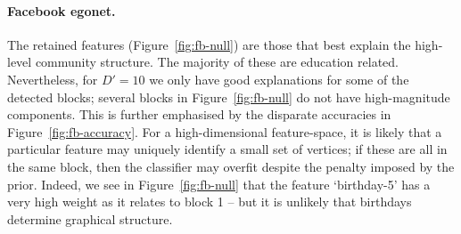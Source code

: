 \paragraph{\textbf{Facebook egonet.}}

The retained features 
(Figure~\ref{fig:fb-null}) are those that best explain the high-level 
community structure. The majority of these are education related. 
Nevertheless, for $D'=10$ we only have good explanations for some of the detected blocks; several blocks in 
Figure~\ref{fig:fb-null} do not have high-magnitude components. This is further emphasised by the disparate accuracies in Figure~\ref{fig:fb-accuracy}.
%
For a high-dimensional feature-space, it is likely that a particular
feature may uniquely identify a small set of vertices; if these are all in the same block, then the classifier may overfit despite the penalty imposed by the prior. Indeed, we see in
Figure~\ref{fig:fb-null} that the feature `birthday-5' has a very high weight as it relates to block 1 – but it is unlikely that birthdays determine graphical structure.
